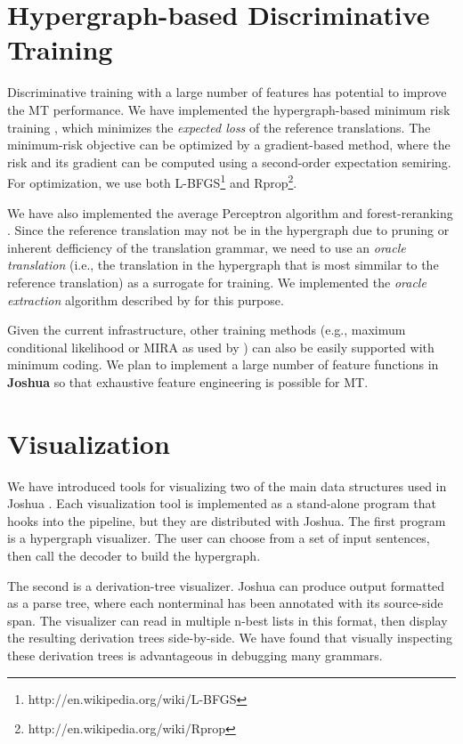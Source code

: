 \documentclass[11pt]{article}
\newcommand{\joshua}{\textbf{Joshua}\xspace}
\begin{document}
\section{Hypergraph-based Discriminative Training}

Discriminative training with a large number of features has 
potential to improve the MT performance.
We have implemented the hypergraph-based minimum risk training \cite{li-eisner:2009:EMNLP},
which minimizes the {\em expected loss} of the reference translations.
The minimum-risk objective can be optimized by a gradient-based method, where
the risk and its gradient can be computed using a second-order expectation semiring.
For optimization, we use both L-BFGS\footnote{http://en.wikipedia.org/wiki/L-BFGS} 
and Rprop\footnote{http://en.wikipedia.org/wiki/Rprop}.

We have also implemented the average Perceptron algorithm and forest-reranking \cite{zhifei-forest-reranking-galebook}.
Since the reference translation may not be in the hypergraph due to pruning or inherent
defficiency of the translation grammar, we need to use an {\em oracle translation} (i.e., the translation in
the hypergraph that is most simmilar to the reference translation) as a surrogate for training.
We implemented the {\em oracle extraction} algorithm described by 
for this purpose.

Given the current infrastructure, other training methods 
(e.g., maximum conditional likelihood or MIRA as used by )
can also be easily supported with minimum coding.
We plan to implement a large number of feature functions in \joshua so that exhaustive 
feature engineering is possible for MT.

\section{Visualization}

We have introduced tools for visualizing two of the main data structures used
in Joshua \cite{PBML-2010-Joshua-transliteration}. Each visualization tool is implemented as a
stand-alone program that hooks into the pipeline, but they are distributed with
Joshua. The first program is a hypergraph visualizer. The user can choose from
a set of input sentences, then call the decoder to build the hypergraph.

The second is a derivation-tree visualizer. Joshua can produce output formatted
as a parse tree, where each nonterminal has been annotated with its source-side
span. The visualizer can read in multiple n-best lists in this format, then
display the resulting derivation trees side-by-side. We have found that
visually inspecting these derivation trees is advantageous in debugging many
grammars.
\end{document}

